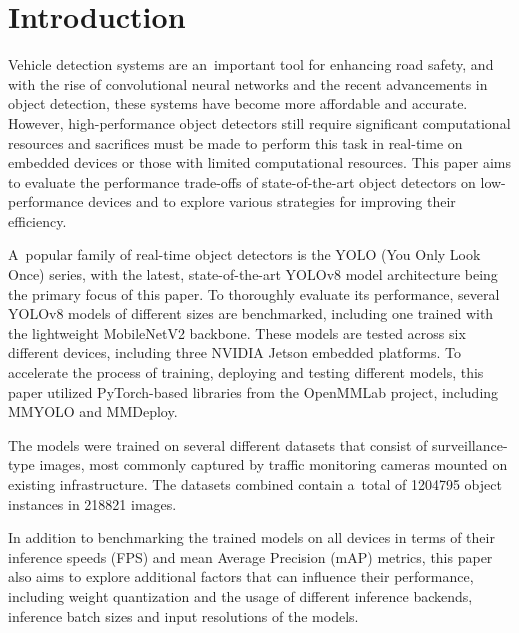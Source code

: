 % 






\newpage
\chapter{Introduction}

Vehicle detection systems are an~important tool for enhancing road safety, and
with the rise of convolutional neural networks and the recent advancements in
object detection, these systems have become more affordable and accurate.
However, high-performance object detectors still require significant
computational resources and sacrifices must be made to perform this task in
real-time on embedded devices or those with limited computational resources.
This paper aims to evaluate the performance trade-offs of state-of-the-art
object detectors on low-performance devices and to explore various strategies
for improving their efficiency.

A~popular family of real-time object detectors is the YOLO (You Only Look Once)
series, with the latest, state-of-the-art YOLOv8 model architecture being the
primary focus of this paper. To thoroughly evaluate its performance, several
YOLOv8 models of different sizes are benchmarked, including one trained with the
lightweight MobileNetV2 backbone. These models are tested across six different
devices, including three NVIDIA Jetson embedded platforms. To accelerate the
process of training, deploying and testing different models, this paper utilized
PyTorch-based libraries from the OpenMMLab project, including MMYOLO and
MMDeploy.

The models were trained on several different datasets that consist of
surveillance-type images, most commonly captured by traffic monitoring cameras
mounted on existing infrastructure. The datasets combined contain a~total of
\num{1204795} object instances in \num{218821} images.

In addition to benchmarking the trained models on all devices in terms of their
inference speeds (FPS) and mean Average Precision (mAP) metrics, this paper also
aims to explore additional factors that can influence their performance,
including weight quantization and the usage of different inference backends,
inference batch sizes and input resolutions of the models.


